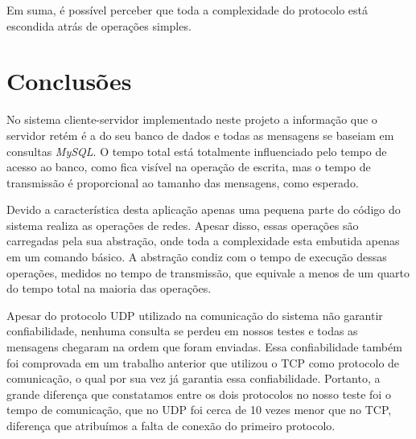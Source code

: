 \documentclass[12pt,a4paper]{article}
\begin{document}
Em suma, é possível perceber que toda a complexidade do protocolo está escondida atrás de operações simples.

\section{Conclusões}

No sistema cliente-servidor implementado neste projeto a informação que o servidor retém é a do seu banco de dados e todas as mensagens se baseiam em consultas {\it MySQL}. O tempo total está totalmente influenciado pelo tempo de acesso ao banco, como fica visível na operação de escrita, mas o tempo de transmissão é proporcional ao tamanho das mensagens, como esperado.

Devido a característica desta aplicação apenas uma pequena parte do código do sistema realiza as operações de redes. Apesar disso, essas operações são carregadas pela sua abstração, onde toda a complexidade esta embutida apenas em um comando básico. A abstração condiz com o tempo de execução dessas operações, medidos no tempo de transmissão, que equivale a menos de um quarto do tempo total na maioria das operações.

Apesar do protocolo UDP utilizado na comunicação do sistema não garantir confiabilidade, nenhuma consulta se perdeu em nossos testes e todas as mensagens chegaram na ordem que foram enviadas. Essa confiabilidade também foi comprovada em um trabalho anterior que utilizou o TCP como protocolo de comunicação, o qual por sua vez já garantia essa confiabilidade. Portanto, a grande diferença que constatamos entre os dois protocolos no nosso teste foi o tempo de comunicação, que no UDP foi cerca de 10 vezes menor que no TCP, diferença que atribuímos a falta de conexão do primeiro protocolo.


\singlespace


\end{document}
